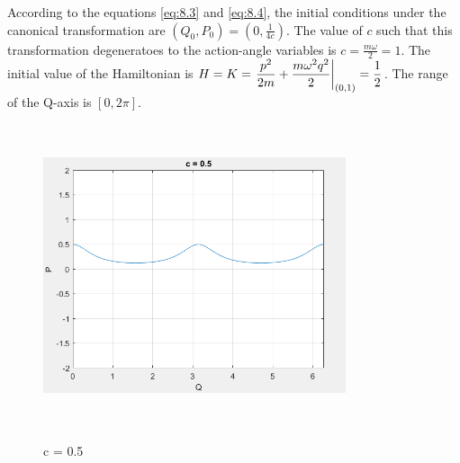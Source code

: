 \documentclass{article}
\begin{document}
\justify
According to the equations \eqref{eq:8.3} and \eqref{eq:8.4}, the initial conditions under the canonical transformation are $\displaystyle{(Q_0, P_0) = (0,\frac{1}{4c})}$. The value of $c$ such that this transformation degeneratoes to the action-angle variables is $\displaystyle{c=\frac{m\omega}{2} = 1}$. The initial value of the Hamiltonian is $\displaystyle{H = K = \eval{\frac{p^2}{2m} + \frac{m\omega^2q^2}{2}}_{(0,1)} = \frac{1}{2}}$. The range of the Q-axis is $[0,2\pi]$. 
\begin{figure}[!htb]
    \centering
    \includegraphics[width=3.5in,height=3.5in,keepaspectratio]{C0p5.PNG}
    \label{fig:C0p5}
    \caption{c = 0.5}
\end{figure}
\end{document}
